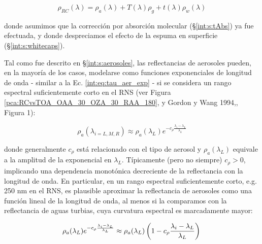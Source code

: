     \begin{equation}
            \rho_{RC}(\lambda) = \rho_{a}(\lambda) +  T(\lambda)\rho_{g} +  t(\lambda)\rho_{w}(\lambda)
            \label{blr:eq:rcdesc}
    \end{equation}
    
    \noindent donde asumimos que la corrección por absorción molecular (\S \ref{int:s:tAbs}) ya fue efectuada, y donde despreciamos el efecto de la espuma en superficie (\S \ref{int:s:whitecaps}).
    
    Tal como fue descrito en \S \ref{int:s:aerosoles}, las reflectancias de aerosoles pueden, en la mayoría de los casos, modelarse como funciones exponenciales de longitud de onda - similar a la Ec. \ref{int:eq:tau_aer_exp} - si se considera un rango espectral suficientemente corto en el RNS (ver Figura \ref{pca:RCvsTOA_OAA_30_OZA_30_RAA_180}, y Gordon y Wang 1994,\cite{gordon1994}, Figura 1):
    
    \begin{equation}
        \rho_{a}(\lambda_{i = L,M,R})
        \approx
        \rho_{a}(\lambda_{L})e^{-c_{\rho}\frac{\lambda_{i}-\lambda_{L}}{\lambda_{L}}}
        \label{blr:eq:aerexp} 
    \end{equation}
    
    \noindent donde generalmente $c_{\rho}$ está relacionado con el tipo de aerosol y $\rho_{a}(\lambda_{L})$ equivale a la amplitud de la exponencial en $\lambda_{L}$. Típicamente (pero no siempre) $c_{\rho}>0$, implicando una dependencia monotónica decreciente de la reflectancia con la longitud de onda.
    En particular, en un rango espectral suficientemente corto, e.g. 250 nm en el RNS, es plausible aproximar la reflectancia de aerosoles como una función lineal de la longitud de onda, al menos si la comparamos con la reflectancia de aguas turbias, cuya curvatura espectral es marcadamente mayor:
    
    \begin{equation}
        \rho_{a}(\lambda_{L})e^{-c_{\rho}\frac{\lambda_{i}-\lambda_{L}}{\lambda_{L}}}
        \approx
        \rho_{a}(\lambda_{L})\left(1-c_{\rho}\frac{\lambda_{i}-\lambda_{L}}{\lambda_{L}}\right)\\
        \label{blr:eq:aerlinear}    
    \end{equation}
    
